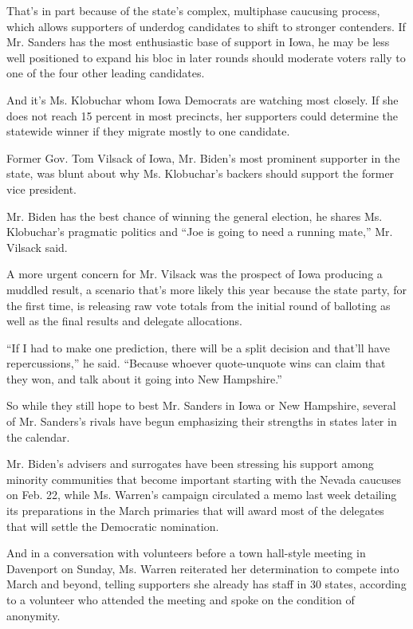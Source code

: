 That's in part because of the state's complex, multiphase caucusing
process, which allows supporters of underdog candidates to shift to
stronger contenders. If Mr. Sanders has the most enthusiastic base of
support in Iowa, he may be less well positioned to expand his bloc in
later rounds should moderate voters rally to one of the four other
leading candidates.

And it's Ms. Klobuchar whom Iowa Democrats are watching most closely. If
she does not reach 15 percent in most precincts, her supporters could
determine the statewide winner if they migrate mostly to one candidate.

Former Gov. Tom Vilsack of Iowa, Mr. Biden's most prominent supporter in
the state, was blunt about why Ms. Klobuchar's backers should support
the former vice president.

Mr. Biden has the best chance of winning the general election, he shares
Ms. Klobuchar's pragmatic politics and ``Joe is going to need a running
mate,'' Mr. Vilsack said.

A more urgent concern for Mr. Vilsack was the prospect of Iowa producing
a muddled result, a scenario that's more likely this year because the
state party, for the first time, is releasing raw vote totals from the
initial round of balloting as well as the final results and delegate
allocations.

``If I had to make one prediction, there will be a split decision and
that'll have repercussions,'' he said. ``Because whoever quote-unquote
wins can claim that they won, and talk about it going into New
Hampshire.''

So while they still hope to best Mr. Sanders in Iowa or New Hampshire,
several of Mr. Sanders's rivals have begun emphasizing their strengths
in states later in the calendar.

Mr. Biden's advisers and surrogates have been stressing his support
among minority communities that become important starting with the
Nevada caucuses on Feb. 22, while Ms. Warren's campaign circulated a
memo last week detailing its preparations in the March primaries that
will award most of the delegates that will settle the Democratic
nomination.

And in a conversation with volunteers before a town hall-style meeting
in Davenport on Sunday, Ms. Warren reiterated her determination to
compete into March and beyond, telling supporters she already has staff
in 30 states, according to a volunteer who attended the meeting and
spoke on the condition of anonymity.

